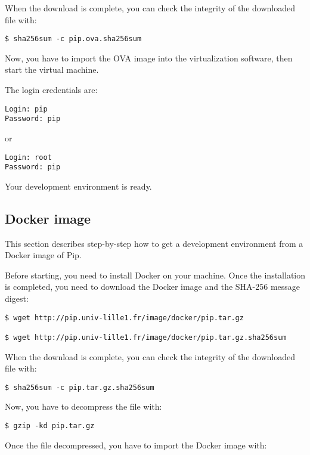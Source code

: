 \documentclass[10pt,a4paper,titlepage]{refart}
\begin{document}
When the download is complete, you can check the integrity of the downloaded
file with:

\begin{lstlisting}[style=BashStyle]
$ sha256sum -c pip.ova.sha256sum
\end{lstlisting}

Now, you have to import the OVA image into the virtualization software, then
start the virtual machine.

The login credentials are:

\begin{lstlisting}
Login: pip
Password: pip
\end{lstlisting}

or

\begin{lstlisting}
Login: root
Password: pip
\end{lstlisting}

Your development environment is ready.

\subsection{Docker image}

This section describes step-by-step how to get a development environment from a
Docker image of Pip.

Before starting, you need to install Docker on your machine. Once the
installation is completed, you need to download the Docker image and the SHA-256
message digest:

\begin{lstlisting}[style=BashStyle]
$ wget http://pip.univ-lille1.fr/image/docker/pip.tar.gz

$ wget http://pip.univ-lille1.fr/image/docker/pip.tar.gz.sha256sum
\end{lstlisting}

When the download is complete, you can check the integrity of the downloaded
file with:

\begin{lstlisting}[style=BashStyle]
$ sha256sum -c pip.tar.gz.sha256sum
\end{lstlisting}

Now, you have to decompress the file with:

\begin{lstlisting}[style=BashStyle]
$ gzip -kd pip.tar.gz
\end{lstlisting}

Once the file decompressed, you have to import the Docker image with:
\end{document}
